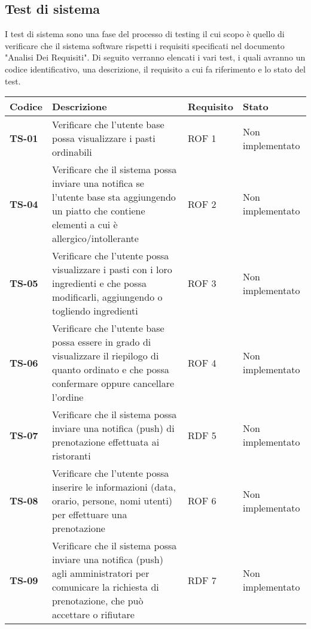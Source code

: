\subsection{Test di sistema}
I test di sistema sono una fase del processo di testing il cui scopo è quello di verificare che il sistema software rispetti i requisiti specificati nel documento "Analisi Dei Requisiti".
Di seguito verranno elencati i vari test, i quali avranno un codice identificativo, una descrizione, il requisito a cui fa riferimento e lo stato del test.
    \begin{longtable}{|>{\centering\arraybackslash}p{1.5cm}|p{9.8cm}|p{2cm}|p{3.5cm}|}
    \hline
    \rowcolor{gray!30}
    \textbf{Codice} & \textbf{Descrizione} & \textbf{Requisito} & \textbf{Stato} \\
    \hline
    \rowcolor{gray!10}
    \textbf{TS-01} & Verificare che l'utente base possa visualizzare i pasti ordinabili & ROF 1 & Non implementato \\
    \hline
    \rowcolor{gray!10}
    \textbf{TS-04} & Verificare che il sistema possa inviare una notifica se l'utente base sta aggiungendo un piatto che contiene elementi a cui è allergico/intollerante & ROF 2 & Non implementato \\ 
    \hline 
    \rowcolor{gray!10}
    \textbf{TS-05} & Verificare che l'utente possa visualizzare i pasti con i loro ingredienti e che possa modificarli, aggiungendo o togliendo ingredienti & ROF 3 & Non implementato \\ 
    \hline
    \rowcolor{gray!10}
    \textbf{TS-06} & Verificare che l'utente base possa essere in grado di visualizzare il riepilogo di quanto ordinato e che possa confermare oppure cancellare l'ordine & ROF 4 & Non implementato \\ 
    \hline
    \rowcolor{gray!10}
    \textbf{TS-07} & Verificare che il sistema possa inviare una notifica (push) di prenotazione effettuata ai ristoranti & RDF 5 & Non implementato \\ 
    \hline
    \rowcolor{gray!10}
    \textbf{TS-08} & Verificare che l'utente possa inserire le informazioni (data, orario, persone, nomi utenti) per effettuare una prenotazione & ROF 6 & Non implementato \\
    \hline
    \rowcolor{gray!10}
    \textbf{TS-09} & Verificare che il sistema possa inviare una notifica (push) agli amministratori per comunicare la richiesta di prenotazione, che può accettare o rifiutare & RDF 7 & Non implementato \\

\end{longtable}

